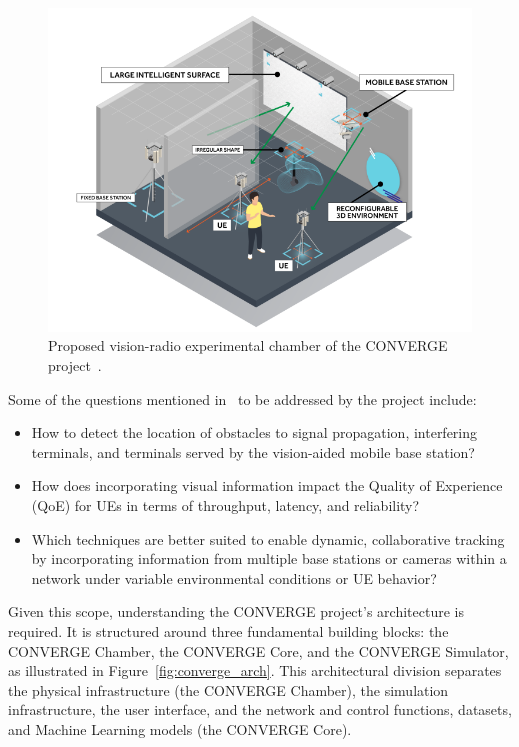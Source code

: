 \begin{figure}[H]
    \centering
    \includegraphics[width=0.7\linewidth]{figures/chamber_converge}
    \caption[Proposed vision-radio experimental chamber of the CONVERGE project]{Proposed vision-radio experimental chamber of the CONVERGE project~\cite{converge2023_usecases}.}
    \label{fig:chamber_converge}
\end{figure}



Some of the questions mentioned in~\cite{converge2023_usecases} to be addressed by the project include:

\begin{itemize}
    \item How to detect the location of obstacles to signal propagation, interfering terminals, and terminals served by the vision-aided mobile base station?
    \item How does incorporating visual information impact the Quality of Experience (QoE) for UEs in terms of throughput, latency, and reliability?
    \item Which techniques are better suited to enable dynamic, collaborative tracking by incorporating information from multiple base stations or cameras within a network under variable environmental conditions or UE behavior?
\end{itemize}

Given this scope, understanding the CONVERGE project’s architecture is required.
It is
structured around three fundamental building blocks: the CONVERGE Chamber, the CONVERGE Core, and the CONVERGE Simulator, as illustrated in Figure~\ref{fig:converge_arch}.
This architectural division separates the physical infrastructure (the CONVERGE Chamber), the simulation infrastructure, the user interface, and the network and control functions, datasets,
and Machine Learning models (the CONVERGE Core).

